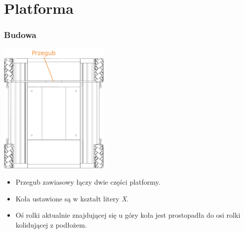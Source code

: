 \documentclass{beamer}
\begin{document}
	\section{Platforma}
	\begin{frame}
		\frametitle{Budowa}
		\centering
		\includegraphics[width=0.4\textwidth]{graphics/base_top.png}
		\begin{itemize}
			\item Przegub zawiasowy łączy dwie części platformy.
			\item Koła ustawione są w kształt litery \emph{X}.
			\item Oś rolki aktualnie znajdującej się u góry koła jest prostopadła do osi rolki kolidującej z podłożem.
		\end{itemize}
	\end{frame}
\end{document}
